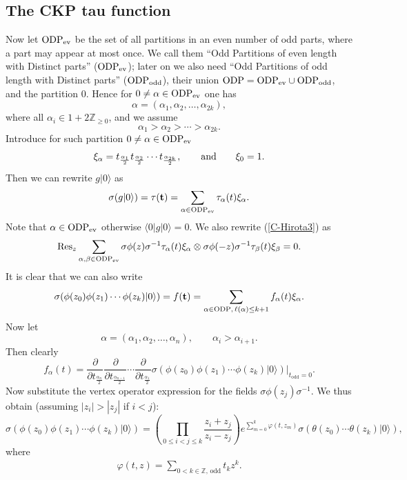 \documentclass[pdftex]{sigma}
\numberwithin{equation}{section}
\newcommand{\Res}{\mathop\mathrm{Res}\nolimits}
\begin{document}
\subsection{The CKP tau function}

Now let $\rm ODP_{\rm ev}$ be the set of all partitions in an even
number of odd parts, where a part may appear at most once. We call
them ``Odd  Partitions of even length with Distinct parts'' ($\rm
ODP_{\rm ev}$); later on we also need ``Odd Partitions of odd length
with Distinct parts'' ($\rm ODP_{\rm odd}$), their union
$\rm ODP=ODP_{\rm ev}\cup ODP_{\rm odd}$, and the partition 0.
Hence for $0\ne \alpha\in \rm ODP_{\rm ev}$  one has
\[
\alpha=(\alpha_1,\alpha_2,\ldots,\alpha_{2k}) ,
\]
where all $\alpha_i\in 1+2\mathbb{Z}_{\ge0}$, and we assume
\[
\alpha_1>\alpha_2>\cdots>\alpha_{2k} .
\]
Introduce for such partition $0\ne \alpha\in \rm ODP_{\rm ev}$
\[
\xi_\alpha=t_{\frac{\alpha_1}2}
t_{\frac{\alpha_2}2}\cdots t_{\frac{\alpha_{2k}}2} ,\qquad\hbox{and}\qquad
\xi_0=1 .
\]
Then we can rewrite $g|0\rangle$ as
\[
\sigma(g|0\rangle)=\tau({\bf t})=\sum_{\alpha \in \rm ODP_{\rm ev}}
\tau_\alpha(t)\xi_\alpha  .
\]
Note that  $\alpha \in \rm ODP_{\rm ev}$ otherwise $\langle
0|g|0\rangle=0$. We also rewrite  (\ref{C-Hirota3}) as
\[
\Res_z \sum_{\alpha,\beta \in \rm ODP_{\rm
ev}}\sigma\phi(z)\sigma^{-1} \tau_\alpha(t)\xi_\alpha\otimes
\sigma\phi(-z)\sigma^{-1}\tau_\beta(t)\xi_\beta =0 .
\]
It is clear that we can also write
\begin{gather}
\label{prodphi}
\sigma(\phi(z_0)\phi(z_1)\cdots\phi(z_{k})|0\rangle) = f({\bf t})=
\sum_{\alpha\in {\rm ODP},\,\ell(\alpha)\le k+1}
f_\alpha(t)\xi_\alpha .
\end{gather}
Now let
\[
\alpha=(\alpha_1,\alpha_2,\ldots,\alpha_n) ,\qquad
\alpha_i>\alpha_{i+1} .
\]
Then clearly
\[
f_\alpha(t)=\frac{\partial}{\partial t_{\frac{\alpha_n}2}}
\frac{\partial}{\partial t_{\frac{\alpha_{n-1}}2}}\cdots
\frac{\partial}{\partial
t_{\frac{\alpha_1}2}}\sigma(\phi(z_0)\phi(z_1)\cdots\phi(z_{k})|0\rangle)
\biggr|_{t_\mathrm{odd}=0}  .
\]
Now substitute the vertex operator expression for the f\/ields
$\sigma\phi(z_j)\sigma^{-1}$. We thus obtain (assu\-ming
$|z_i|>|z_j|$ if $i<j$):
\[
\sigma(\phi(z_0)\phi(z_1)\cdots\phi(z_{k})|0\rangle)=
\left(\prod_{0\le i<j\le k}\frac{z_i+{z_j}}{z_i-{z_j}}\right)
e^{\sum\limits_{m=0}^k
\varphi(t,z_m)}\sigma(\theta(z_0)\cdots\theta(z_{k})|0\rangle) ,
 \]
where
 \begin{gather}\label{varphi}
\varphi(t,z) = \sum_{0<k\in\mathbb{Z},\,\mathrm{odd}}t_kz^k  .
 \end{gather}
\end{document}
